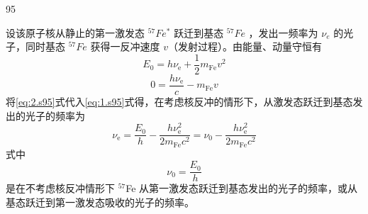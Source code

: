 \begin{solution}{95}
\begin{subsolution}
设该原子核从静止的第一激发态 $^{57}Fe^{*}$ 跃迁到基态 $^{57}Fe$ ，发出一频率为 $\nu_{e}$ 的光子，同时基态 $^{57}Fe$ 获得一反冲速度 $v$（发射过程）。由能量、动量守恒有
\begin{equation}
E _ {0} = h \nu_ {\mathrm{e}} + \frac {1}{2} m _ {\mathrm{Fe}} v ^ {2}
\label{eq:1.s95}
\end{equation}
\begin{equation}
0 = \frac {h \nu_ {\mathrm{e}}}{c} - m _ {\mathrm{Fe}} v
\label{eq:2.s95}
\end{equation}
将\eqref{eq:2.s95}式代入\eqref{eq:1.s95}式得，在考虑核反冲的情形下，从激发态跃迁到基态发出的光子的频率为
\begin{equation}
\nu_ {\mathrm{e}} = \frac {E _ {0}}{h} - \frac {h \nu_ {\mathrm{e}} ^ {2}}{2 m _ {\mathrm{Fe}} c ^ {2}} = \nu_ {0} - \frac {h \nu_ {\mathrm{e}} ^ {2}}{2 m _ {\mathrm{Fe}} c ^ {2}}
\label{eq:3.s95}
\end{equation}
式中
\begin{equation}
\nu_ {0} = \frac {E _ {0}}{h}
\label{eq:4.s95}
\end{equation}
是在不考虑核反冲情形下 $^{57}$Fe 从第一激发态跃迁到基态发出的光子的频率，或从基态跃迁到第一激发态吸收的光子的频率。


\end{subsolution}
\end{solution}
